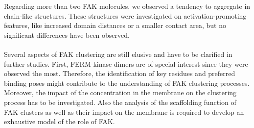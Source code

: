 Regarding more than two FAK molecules, we observed a tendency to aggregate in chain-like structures. These structures were investigated on activation-promoting features, like increased domain distances or a smaller contact area, but no significant differences have been observed.\\
\\
Several aspects of FAK clustering are still elusive and have to be clarified in further studies. First, FERM-kinase dimers are of special interest since they were observed the most. Therefore, the identification of key residues and preferred binding poses might contribute to the understanding of FAK clustering processes. Moreover, the impact of the \pip{} concentration in the membrane on the clustering process has to be investigated. Also the analysis of the scaffolding function of FAK clusters as well as their impact on the membrane is required to develop an exhaustive model of the role of FAK.
